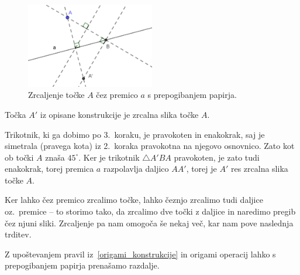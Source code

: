 \begin{figure}[h]
    \centering
    \includegraphics[width=0.5\textwidth]{images/zrcaljenje_tocke_cez_premico.png}
    \caption[Zrcaljenje čez premico]{Zrcaljenje točke $A$ čez premico $a$ s prepogibanjem papirja.}
    \label{fig:zrcaljenje_cez_premico}
\end{figure}

\begin{trditev}
    Točka $A'$ iz opisane konstrukcije je zrcalna slika točke $A$.
\end{trditev}

\begin{dokaz}
    Trikotnik, ki ga dobimo po 3.\ koraku, je pravokoten in enakokrak, saj je simetrala (pravega kota) iz 2.\ koraka pravokotna na njegovo osnovnico. Zato kot ob točki $A$ znaša $45^{\circ}$. Ker je trikotnik $\triangle A'BA$ pravokoten, je zato tudi enakokrak, torej premica $a$ razpolavlja daljico $AA'$, torej je $A'$ res zrcalna slika točke $A$.
\end{dokaz}

Ker lahko čez premico zrcalimo točke, lahko čeznjo zrcalimo tudi daljice oz.\ premice -- to storimo tako, da zrcalimo dve točki z daljice in naredimo pregib čez njuni sliki. Zrcaljenje pa nam omogoča še nekaj več, kar nam pove naslednja trditev.


\begin{trditev}
    \label{trd:prenasanje_razdalj}
    Z upoštevanjem pravil iz~\ref{origami_konstrukcije} in origami operacij lahko s prepogibanjem papirja prenašamo razdalje.
\end{trditev}

